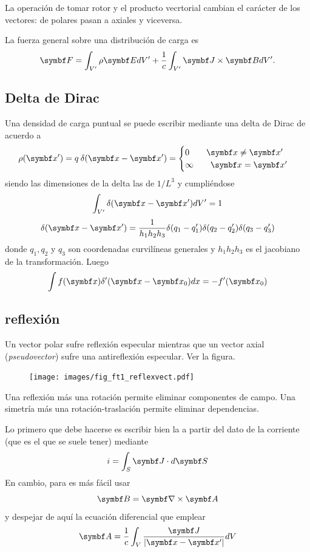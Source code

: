 \documentclass[10pt,oneside]{CBFT_book}
\begin{document}
La operación de tomar rotor y el producto vecrtorial cambian el carácter de los vectores: de
polares pasan a axiales y viceversa.

La fuerza general sobre una distribución de carga es
\[
	\vb{F} = \int_{V'} \rho \vb{E} dV' + \frac{1}{c} \int_{V'} \vb{J} \times \vb{B} dV'. 
\]

\subsection{Delta de Dirac}

Una densidad de carga puntual se puede escribir mediante una delta de Dirac de acuerdo a
\[
	\rho(\vb{x}') = q\: \delta (\vb{x} - \vb{x}') = \begin{cases}
	                                               0 \qquad \vb{x} \neq \vb{x}' \\
	                                               \infty \qquad \vb{x} = \vb{x}'\\
	                                              \end{cases}
\]
siendo las dimensiones de la delta las de $1/L^3$ y cumpliéndose 
\[
	\int_{V'} \delta (\vb{x} - \vb{x}') dV' = 1
\]
\[
	\delta (\vb{x} - \vb{x}') = \frac{1}{h_1h_2h_3} \delta(q_1-q_1') \delta(q_2-q_2') \delta(q_3-q_3')
\]
donde $q_1, q_2$ y $q_3$ son coordenadas curvilíneas generales y $h_1h_2h_3$ es el jacobiano
de la transformación.
Luego
\[
	\int f(\vb{x}) \delta' (\vb{x} - \vb{x}_0) dx = -f'(\vb{x}_0)
\]



\subsection{reflexión}

Un vector polar sufre reflexión especular mientras que un vector axial ({\it pseudovector})
sufre una antireflexión especular. Ver la figura.

\begin{figure}[htb]
	\begin{center}
	\texttt{[image: images/fig\_ft1\_reflexvect.pdf]}	 
	\end{center}
	\caption{}
\end{figure} 

Una reflexión más una rotación permite eliminar componentes de campo.
Una simetría más una rotación-traslación permite eliminar dependencias.

Lo primero que debe hacerse es escribir bien la  a partir del dato de la corriente
(que es el que se suele tener) mediante
\[
	i = \int_S \vb{J} \cdot d \vb{S}
\]
En cambio, para  es más fácil usar
\[
	\vb{B} = \rotorm{A}
\]
y despejar de aquí la ecuación diferencial que emplear
\[
	\vb{A} = \frac{1}{c} \int_V \frac{\vb{J}}{|\vb{x}-\vb{x}'|} dV
\]
\end{document}
